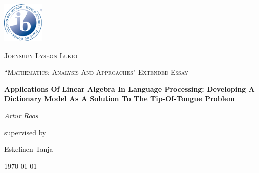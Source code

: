 \documentclass{article}
\begin{document}
\begin{titlepage}
	\centering
	\includegraphics[width=0.15\textwidth]{dp-programme-logo}\par\vspace{1cm}
	{\textsc{Joensuun Lyseon Lukio} \par}
	\vspace{1cm}
	{\Large \textsc{``Mathematics: Analysis And Approaches" Extended Essay}\par}
	\vspace{1.5cm}
	{\huge\bfseries Applications Of Linear Algebra In Language Processing: Developing A Dictionary Model As A Solution To The Tip-Of-Tongue Problem\par}
	\vspace{2cm}
	{\Large\itshape Artur Roos\par}
	\vfill
	supervised by\par
	Eskelinen Tanja
	\vfill
	{\large \today\par}
\end{titlepage}

\clearpage
{}
\tableofcontents
\vspace{48pt}
\end{document}

